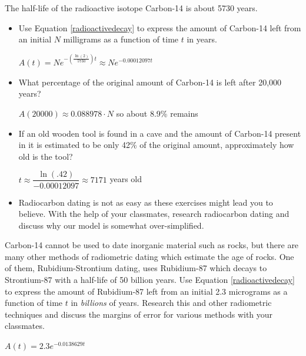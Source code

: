 \documentclass{ximera}
\begin{document}
\begin{problem}
The half-life of the radioactive isotope Carbon-14 is about 5730 years. 

\begin{itemize}
    \item
    Use Equation \ref{radioactivedecay} to express the amount of Carbon-14 left from an initial $N$ milligrams as a function of time $t$ in years.

\begin{solution}
    $A(t) = Ne^{-\left(\frac{\ln(2)}{5730}\right)t} \approx Ne^{-0.00012097t}$
\end{solution}
    
\item 
    What percentage of the original amount of Carbon-14 is left after 20,000 years?

\begin{solution}
    $A(20000) \approx 0.088978 \cdot N$ so about 8.9\% remains
\end{solution}
    
\item
    If an old wooden tool is found in a cave and the amount of Carbon-14 present in it is estimated to be only 42\% of the original amount, approximately how old is the tool?

\begin{solution}
    $t \approx \dfrac{\ln(.42)}{-0.00012097} \approx 7171$ years old
\end{solution}
    
\item
     Radiocarbon dating is not as easy as these exercises might lead you to believe.  With the help of your classmates, research radiocarbon dating and discuss why our model is somewhat over-simplified.  
\end{itemize}
    
\end{problem}
 

\begin{problem}
 Carbon-14 cannot be used to date inorganic material such as rocks, but there are many other methods of radiometric dating which estimate the age of rocks.  One of them, Rubidium-Strontium dating, uses Rubidium-87 which decays to Strontium-87 with a half-life of 50 billion years.  Use Equation \ref{radioactivedecay} to express the amount of Rubidium-87 left from an initial 2.3 micrograms as a function of time $t$ in \emph{billions} of years.  Research this and other radiometric techniques and discuss the margins of error for various methods with your classmates.

\begin{solution}
    $A(t) = 2.3e^{-0.0138629t}$
\end{solution}
 
\end{problem}
\end{document}
